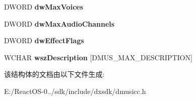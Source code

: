 \begin{DoxyCompactItemize}
D\+W\+O\+RD {\bfseries dw\+Max\+Voices}
\item 
\mbox{\label{struct___d_m_u_s___p_o_r_t_c_a_p_s_a6ce13a7f5d8850507901456cd297b680}} 
D\+W\+O\+RD {\bfseries dw\+Max\+Audio\+Channels}
\item 
\mbox{\label{struct___d_m_u_s___p_o_r_t_c_a_p_s_a8468520a84af79c86bdf882a56f62d24}} 
D\+W\+O\+RD {\bfseries dw\+Effect\+Flags}
\item 
\mbox{\label{struct___d_m_u_s___p_o_r_t_c_a_p_s_a59ae6d034a50816a72b953eee9df42f9}} 
W\+C\+H\+AR {\bfseries wsz\+Description} \mbox{[}D\+M\+U\+S\+\_\+\+M\+A\+X\+\_\+\+D\+E\+S\+C\+R\+I\+P\+T\+I\+ON\mbox{]}
\end{DoxyCompactItemize}


该结构体的文档由以下文件生成\+:\begin{DoxyCompactItemize}
\item 
E\+:/\+React\+O\+S-\/0../sdk/include/dxsdk/dmusicc.\+h\end{DoxyCompactItemize}
